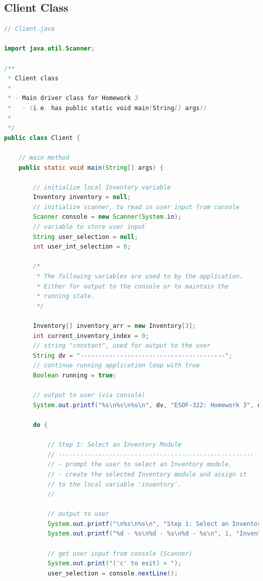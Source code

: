 \documentclass[12pt]{article}
\begin{document}
\subsection*{Client Class}
\begin{lstlisting}[language=Java]
// Client.java

import java.util.Scanner;

/**
 * Client class
 * 
 * - Main driver class for Homework 3
 *   - (i.e. has public static void main(String[] args))
 *   
 */
public class Client {

    // main method
    public static void main(String[] args) {

        // initialize local Inventory variable
        Inventory inventory = null;
        // initialize scanner, to read in user input from console
        Scanner console = new Scanner(System.in);
        // variable to store user input
        String user_selection = null;
        int user_int_selection = 0;

        /*
         * The following variables are used to by the application.
         * Either for output to the console or to maintain the 
         * running state.
         */

        Inventory[] inventory_arr = new Inventory[3];
        int current_inventory_index = 0;
        // string "constant", used for output to the user
        String dv = "----------------------------------------";
        // continue running application loop with true
        Boolean running = true;

        // output to user (via console)
        System.out.printf("%s\n%s\n%s\n", dv, "ESOF-322: Homework 3", dv);

        do {
            
            // Step 1: Select an Inventory Module
            // ------------------------------------------------------
            // - prompt the user to select an Inventory module.
            // - create the selected Inventory module and assign it
            // to the local variable 'inventory'.
            //

            // output to user
            System.out.printf("\n%s\n%s\n", "Step 1: Select an Inventory Module", dv);
            System.out.printf("%d - %s\n%d - %s\n%d - %s\n", 1, "Inventory1", 2, "Inventory2", 3, "Inventory3");

            // get user input from console (Scanner)
            System.out.print("('c' to exit) > ");
            user_selection = console.nextLine();


\end{lstlisting}
\end{document}
